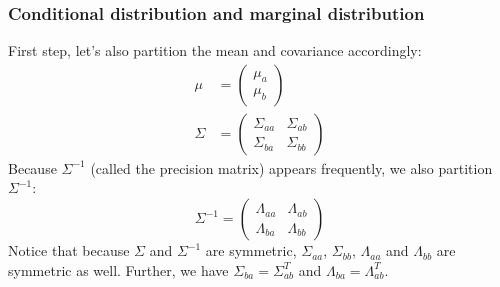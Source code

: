 \documentclass{beamer}
\begin{document}
\begin{frame}
    \frametitle{Conditional distribution and marginal distribution}
    First step, let's also partition the mean and covariance accordingly:
    \begin{align*}
        \mu&=\begin{pmatrix}
            \mu_{a} \\
            \mu_{b}
        \end{pmatrix} \\
        \Sigma&=\begin{pmatrix}
            \Sigma_{aa}&\Sigma_{ab} \\
            \Sigma_{ba}&\Sigma_{bb}
        \end{pmatrix}
    \end{align*}
    Because $\Sigma^{-1}$ (called the precision matrix) appears frequently, we also partition $\Sigma^{-1}$:
    \begin{equation*}
        \Sigma^{-1}=\begin{pmatrix}
            \Lambda_{aa}&\Lambda_{ab} \\
            \Lambda_{ba}&\Lambda_{bb}
        \end{pmatrix}
    \end{equation*}
    Notice that because $\Sigma$ and $\Sigma^{-1}$ are symmetric, $\Sigma_{aa}$, $\Sigma_{bb}$, $\Lambda_{aa}$ and $\Lambda_{bb}$ are symmetric as well. Further, we have $\Sigma_{ba}=\Sigma_{ab}^{T}$ and $\Lambda_{ba}=\Lambda_{ab}^{T}$.
\end{frame}
\end{document}

